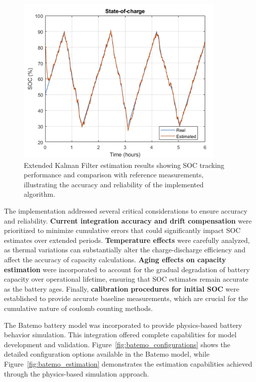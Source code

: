 \begin{figure}[htbp]
\centering
\includegraphics[width=0.9\textwidth]{imgs/EKF_results.png}
\caption{Extended Kalman Filter estimation results showing SOC tracking performance and comparison with reference measurements, illustrating the accuracy and reliability of the implemented algorithm.}
\label{fig:ekf_results}
\end{figure} 

The implementation addressed several critical considerations to ensure accuracy and reliability. \textbf{Current integration accuracy and drift compensation} were prioritized to minimize cumulative errors that could significantly impact SOC estimates over extended periods. \textbf{Temperature effects} were carefully analyzed, as thermal variations can substantially alter the charge-discharge efficiency and affect the accuracy of capacity calculations. \textbf{Aging effects on capacity estimation} were incorporated to account for the gradual degradation of battery capacity over operational lifetime, ensuring that SOC estimates remain accurate as the battery ages. Finally, \textbf{calibration procedures for initial SOC} were established to provide accurate baseline measurements, which are crucial for the cumulative nature of coulomb counting methods.

The Batemo battery model was incorporated to provide physics-based battery behavior simulation. This integration offered complete capabilities for model development and validation. Figure~\ref{fig:batemo_configurations} shows the detailed configuration options available in the Batemo model, while Figure~\ref{fig:batemo_estimation} demonstrates the estimation capabilities achieved through the physics-based simulation approach.

